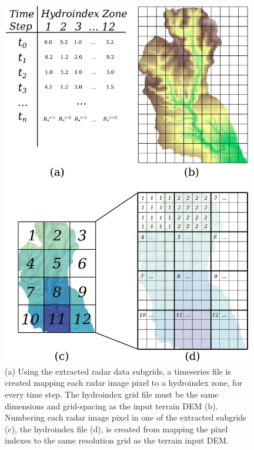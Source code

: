 \begin{figure}[htb]
\includegraphics[width=11cm]{chp_radar/hydroindex.eps}
\caption{(a) Using the extracted radar data subgrids, a timeseries file is created mapping each radar image pixel to a hydroindex zone, for every time step. The hydroindex grid file must be the same dimensions and grid-spacing as the input terrain DEM (b). Numbering each radar image pixel in one of the extracted subgrids (c), the hydroindex file (d), is created from mapping the pixel indexes to the same resolution grid as the terrain input DEM.}
\label{fig_hydroindex}
\end{figure}



